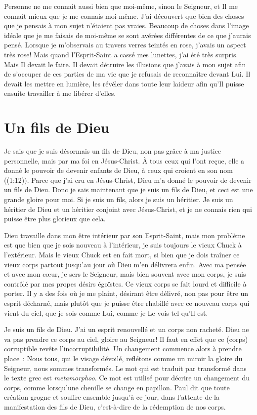 Personne ne me connait aussi bien que moi-même, sinon le Seigneur,
 et Il me connaît mieux que je me connais moi-même.
 J'ai découvert que bien des choses que je pensais
 à mon sujet n'étaient pas vraies.
 Beaucoup de choses dans l'image idéale que je me faisais de moi-même
 se sont avérées différentes de ce que j'aurais pensé.
 Lorsque je m'observais au travers verres teintés en rose,
 j'avais un aspect très rose!
 Mais quand l'Esprit-Saint a cassé mes lunettes,
 j'ai été très surpris. Mais Il devait le faire.
 Il devait détruire les illusions que j'avais à mon sujet afin de s'occuper
 de ces parties de ma vie que je refusais de reconnaître devant Lui.
 Il devait les mettre en lumière, les révéler dans toute leur laideur
 afin qu'Il puisse ensuite travailler à me libérer d'elles.


\section*{Un fils de Dieu}

Je sais que je suis désormais un fils de Dieu,
 non pas grâce à ma justice personnelle,
 mais par ma foi en Jésus-Christ.
 \og À tous ceux qui l'ont reçue, elle a donné le pouvoir
 de devenir enfants de Dieu,
 à ceux qui croient en son nom \fg{} ((1:12)).
 Parce que j'ai cru en Jésus-Christ, Dieu m'a donné le pouvoir
 de devenir un fils de Dieu.
 Donc je sais maintenant que je suis un fils de Dieu,
 et ceci est une grande gloire pour moi.
 Si je suis un fils, alors je suis un héritier.
 Je suis un héritier de Dieu et un héritier conjoint avec Jésus-Christ,
 et je ne connais rien qui puisse être plus glorieux que cela.

Dieu travaille dans mon être intérieur par son Esprit-Saint,
 mais mon problème est que bien que je sois nouveau à l'intérieur,
 je suis toujours le vieux Chuck à l'extérieur.
 Mais le vieux Chuck est en fait mort, si bien que je dois traîner
 ce vieux corps partout jusqu'au jour où Dieu m'en délivrera enfin.
 Avec ma pensée et avec mon cœur, je sers le Seigneur,
 mais bien souvent avec mon corps,
 je suis contrôlé par mes propes désirs égoïstes.
 Ce vieux corps se fait lourd et difficile à porter.
 Il y a des fois où je me plaint, désirant être délivré,
 non pas pour être un esprit décharné, mais plutôt que je puisse
 être rhabillé avec ce nouveau corps qui vient du ciel,
 que je sois comme Lui, comme je Le vois tel qu'Il est.

Je suis un fils de Dieu. J'ai un esprit renouvellé et un corps non racheté.
 Dieu ne va pas prendre ce corps au ciel, gloire au Seigneur!
 \og Il faut en effet que ce (corps) corruptible
 revête l'incorruptibilité. \fg{}
 Un changement commence alors à prendre place~:
 \og Nous tous, qui le visage dévoilé,
 reflétons comme un miroir la gloire du Seigneur,
 nous sommes transformés. \fg{}
 Le mot qui est traduit par \og transformé \fg{}
 dans le texte grec est \emph{metamorphoo}.
 Ce mot est utilisé pour décrire un changement du corps,
 comme lorsqu'une chenille se change en papillon.
 Paul dit que toute création grogne et souffre ensemble
 jusqu'à ce jour, dans l'attente de la manifestation des fils de Dieu,
 c'est-à-dire de la rédemption de nos corps.



